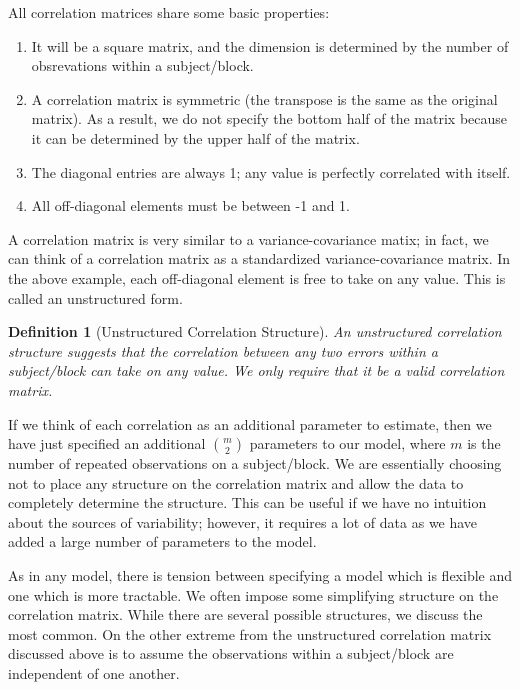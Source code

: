 \documentclass[
]{book}
\providecommand{\tightlist}{%
  \setlength{\itemsep}{0pt}\setlength{\parskip}{0pt}}
\theoremstyle{plain}
\theoremstyle{mydefn}
\newtheorem{definition}{Definition}[chapter]
\theoremstyle{myexmpl}
\theoremstyle{remark}
\begin{document}
\begin{rmdkeyidea}
All correlation matrices share some basic properties:

\begin{enumerate}
\def\labelenumi{\arabic{enumi}.}
\tightlist
\item
  It will be a square matrix, and the dimension is determined by the number of obsrevations within a subject/block.
\item
  A correlation matrix is symmetric (the transpose is the same as the original matrix). As a result, we do not specify the bottom half of the matrix because it can be determined by the upper half of the matrix.
\item
  The diagonal entries are always 1; any value is perfectly correlated with itself.
\item
  All off-diagonal elements must be between -1 and 1.
\end{enumerate}
\end{rmdkeyidea}

A correlation matrix is very similar to a variance-covariance matix; in fact, we can think of a correlation matrix as a standardized variance-covariance matrix. In the above example, each off-diagonal element is free to take on any value. This is called an unstructured form.

\begin{definition}[Unstructured Correlation Structure]
\protect\hypertarget{def:defn-unstructure}{}{\label{def:defn-unstructure} {} }An unstructured correlation structure suggests that the correlation between any two errors within a subject/block can take on any value. We only require that it be a valid correlation matrix.
\end{definition}

If we think of each correlation as an additional parameter to estimate, then we have just specified an additional \(\binom{m}{2}\) parameters to our model, where \(m\) is the number of repeated observations on a subject/block. We are essentially choosing not to place any structure on the correlation matrix and allow the data to completely determine the structure. This can be useful if we have no intuition about the sources of variability; however, it requires a lot of data as we have added a large number of parameters to the model.

As in any model, there is tension between specifying a model which is flexible and one which is more tractable. We often impose some simplifying structure on the correlation matrix. While there are several possible structures, we discuss the most common. On the other extreme from the unstructured correlation matrix discussed above is to assume the observations within a subject/block are independent of one another.
\end{document}
